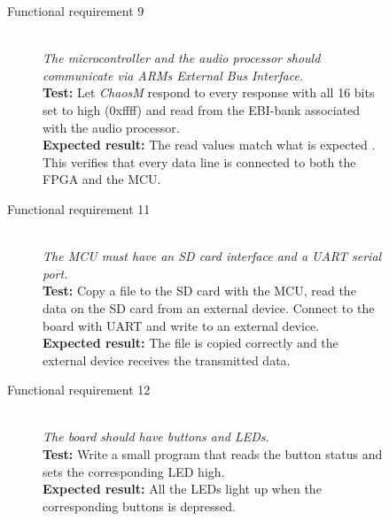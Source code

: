 \begin{figure}[H]
    \label{test:func-test9}
    \begin{description}
        \item[Functional requirement 9] \hfill \\
            \textit{The microcontroller and the audio processor should communicate via ARMs
            External Bus Interface.} \\
            \textbf{Test:} Let \textit{ChaosM} respond to every response with all 16 bits set
            to high (0xffff) and read from the EBI-bank associated with the audio processor. \\
            \textbf{Expected result:} The read values match what is expected . This verifies that every data line is connected to both the FPGA and the MCU.
    \end{description}
\end{figure}

\begin{figure}[H]
    \label{test:func-test11}
    \begin{description}
        \item[Functional requirement 11] \hfill \\
            \textit{The MCU must have an SD card interface and a UART serial port.} \\
            \textbf{Test:} Copy a file to the SD card with the MCU, read the data on the SD card
            from an external device. Connect to the board with UART and write to an external device.\\
            \textbf{Expected result:} The file is copied correctly and the external device receives the
            transmitted data.
    \end{description}
\end{figure}

\begin{figure}[H]
    \label{test:func-test12}
    \begin{description}
        \item[Functional requirement 12] \hfill \\
            \textit{The board should have buttons and LEDs.} \\
            \textbf{Test:} Write a small program that reads the button status and sets
            the corresponding LED high. \\
            \textbf{Expected result:} All the LEDs light up when the corresponding buttons is depressed.
    \end{description}
\end{figure}

